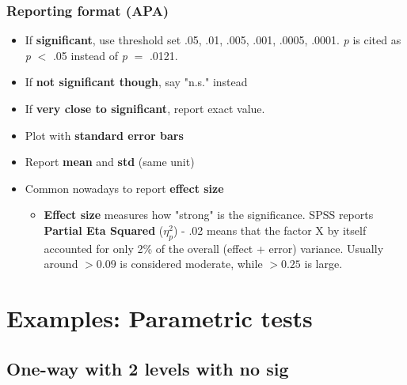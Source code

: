 \documentclass{beamer}
\begin{document}
\begin{frame}
	\frametitle{Reporting format (APA)} 
	\begin{itemize}
		\item If \textbf{significant}, use threshold set {.05, .01, .005, .001, .0005, .0001}.  \textit{p} is cited as \textit{p} $<$ .05 instead of \textit{p} $=$ .0121.   
		\item If \textbf{not significant though},  say "n.s." instead
		\item If \textbf{very close to significant}, report exact value.
		\item Plot with \textbf{standard error bars}
		\item Report \textbf{mean} and \textbf{std}  (same unit)
		\item Common nowadays to report\textbf{ effect size}
		\begin{itemize}
			\item  \textbf{Effect size}  measures how "strong" is the significance.  SPSS reports \textbf{Partial Eta Squared} ($\eta_{p}^{2}$) - .02 means that the factor X by itself accounted for only 2\% of the overall (effect + error) variance.  Usually around $>0.09$ is considered moderate, while $>0.25$ is large.
		\end{itemize}
	\end{itemize}
\end{frame}

\section{Examples: Parametric tests} 

\subsection{One-way with 2 levels with no sig}
\end{document}
